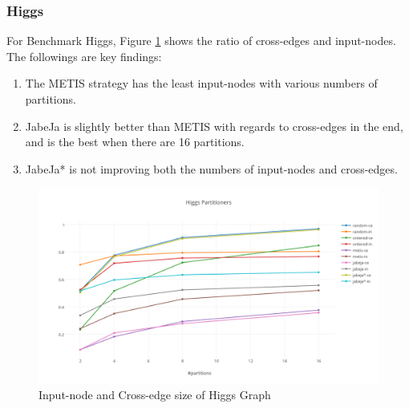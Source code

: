 \subsubsection{Higgs}
For Benchmark Higgs, Figure \ref{fig:Higgs-Partitioners} shows the ratio of cross-edges and input-nodes. The followings are key findings:
\begin{enumerate}
    \item The METIS strategy has the least input-nodes with various numbers of partitions.
    \item JabeJa is slightly better than METIS with regards to cross-edges in the end, and is the best when there are 16 partitions.
    \item JabeJa* is not improving both the numbers of input-nodes and cross-edges.
\end{enumerate}
\begin{figure}[h!]
  \caption{Input-node and Cross-edge size of Higgs Graph}
  \label{fig:Higgs-Partitioners}
  \centering
    \includegraphics[width=1.0\textwidth]{img/Higgs-Partitioners}
\end{figure}



